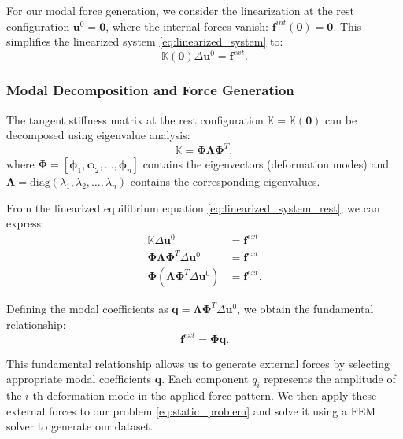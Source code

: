 For our modal force generation, we consider the linearization at the rest configuration $\bm{u}^0 = \bm{0}$, where the internal forces vanish: $\bm{f}^{int}(\bm{0}) = \bm{0}$. This simplifies the linearized system \eqref{eq:linearized_system} to:
\begin{equation}
    \mathbb{K}(\bm{0}) \Delta\bm{u}^0 = \bm{f}^{ext}.
    \label{eq:linearized_system_rest}
\end{equation}

\subsubsection{Modal Decomposition and Force Generation}

The tangent stiffness matrix at the rest configuration $\mathbb{K} = \mathbb{K}(\bm{0})$ can be decomposed using eigenvalue analysis:
\begin{equation}
    \mathbb{K} = \boldsymbol{\Phi} \boldsymbol{\Lambda} \boldsymbol{\Phi}^T,
    \label{eq:eigen_decomposition}
\end{equation}
where $\boldsymbol{\Phi} = [\bm{\phi}_1, \bm{\phi}_2, \ldots, \bm{\phi}_n]$ contains the eigenvectors (deformation modes) and $\boldsymbol{\Lambda} = \text{diag}(\lambda_1, \lambda_2, \ldots, \lambda_n)$ contains the corresponding eigenvalues.

From the linearized equilibrium equation \eqref{eq:linearized_system_rest}, we can express:
\begin{align}
    \mathbb{K} \Delta\bm{u}^0 &= \bm{f}^{ext} \nonumber \\
    \boldsymbol{\Phi} \boldsymbol{\Lambda} \boldsymbol{\Phi}^T \Delta\bm{u}^0 &= \bm{f}^{ext} \nonumber \\
    \boldsymbol{\Phi} (\boldsymbol{\Lambda} \boldsymbol{\Phi}^T \Delta\bm{u}^0) &= \bm{f}^{ext}.
    \label{eq:modal_force_derivation}
\end{align}

Defining the modal coefficients as $\bm{q} = \boldsymbol{\Lambda} \boldsymbol{\Phi}^T \Delta\bm{u}^0$, we obtain the fundamental relationship:
\begin{equation}
    \bm{f}^{ext} = \boldsymbol{\Phi} \bm{q}.
    \label{eq:modal_force_form}
\end{equation}

This fundamental relationship allows us to generate external forces by selecting appropriate modal coefficients $\bm{q}$. Each component $q_i$ represents the amplitude of the $i$-th deformation mode in the applied force pattern. We then apply these external forces to our problem \ref{eq:static_problem} and solve it using a FEM solver to generate our dataset.



